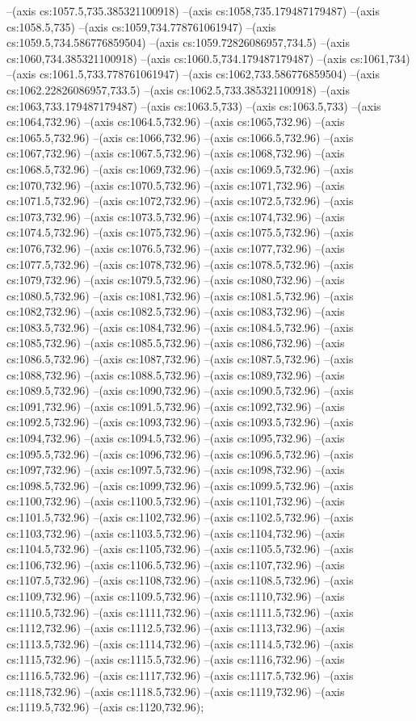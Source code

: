 --(axis cs:1057.5,735.385321100918)
--(axis cs:1058,735.179487179487)
--(axis cs:1058.5,735)
--(axis cs:1059,734.778761061947)
--(axis cs:1059.5,734.586776859504)
--(axis cs:1059.72826086957,734.5)
--(axis cs:1060,734.385321100918)
--(axis cs:1060.5,734.179487179487)
--(axis cs:1061,734)
--(axis cs:1061.5,733.778761061947)
--(axis cs:1062,733.586776859504)
--(axis cs:1062.22826086957,733.5)
--(axis cs:1062.5,733.385321100918)
--(axis cs:1063,733.179487179487)
--(axis cs:1063.5,733)
--(axis cs:1063.5,733)
--(axis cs:1064,732.96)
--(axis cs:1064.5,732.96)
--(axis cs:1065,732.96)
--(axis cs:1065.5,732.96)
--(axis cs:1066,732.96)
--(axis cs:1066.5,732.96)
--(axis cs:1067,732.96)
--(axis cs:1067.5,732.96)
--(axis cs:1068,732.96)
--(axis cs:1068.5,732.96)
--(axis cs:1069,732.96)
--(axis cs:1069.5,732.96)
--(axis cs:1070,732.96)
--(axis cs:1070.5,732.96)
--(axis cs:1071,732.96)
--(axis cs:1071.5,732.96)
--(axis cs:1072,732.96)
--(axis cs:1072.5,732.96)
--(axis cs:1073,732.96)
--(axis cs:1073.5,732.96)
--(axis cs:1074,732.96)
--(axis cs:1074.5,732.96)
--(axis cs:1075,732.96)
--(axis cs:1075.5,732.96)
--(axis cs:1076,732.96)
--(axis cs:1076.5,732.96)
--(axis cs:1077,732.96)
--(axis cs:1077.5,732.96)
--(axis cs:1078,732.96)
--(axis cs:1078.5,732.96)
--(axis cs:1079,732.96)
--(axis cs:1079.5,732.96)
--(axis cs:1080,732.96)
--(axis cs:1080.5,732.96)
--(axis cs:1081,732.96)
--(axis cs:1081.5,732.96)
--(axis cs:1082,732.96)
--(axis cs:1082.5,732.96)
--(axis cs:1083,732.96)
--(axis cs:1083.5,732.96)
--(axis cs:1084,732.96)
--(axis cs:1084.5,732.96)
--(axis cs:1085,732.96)
--(axis cs:1085.5,732.96)
--(axis cs:1086,732.96)
--(axis cs:1086.5,732.96)
--(axis cs:1087,732.96)
--(axis cs:1087.5,732.96)
--(axis cs:1088,732.96)
--(axis cs:1088.5,732.96)
--(axis cs:1089,732.96)
--(axis cs:1089.5,732.96)
--(axis cs:1090,732.96)
--(axis cs:1090.5,732.96)
--(axis cs:1091,732.96)
--(axis cs:1091.5,732.96)
--(axis cs:1092,732.96)
--(axis cs:1092.5,732.96)
--(axis cs:1093,732.96)
--(axis cs:1093.5,732.96)
--(axis cs:1094,732.96)
--(axis cs:1094.5,732.96)
--(axis cs:1095,732.96)
--(axis cs:1095.5,732.96)
--(axis cs:1096,732.96)
--(axis cs:1096.5,732.96)
--(axis cs:1097,732.96)
--(axis cs:1097.5,732.96)
--(axis cs:1098,732.96)
--(axis cs:1098.5,732.96)
--(axis cs:1099,732.96)
--(axis cs:1099.5,732.96)
--(axis cs:1100,732.96)
--(axis cs:1100.5,732.96)
--(axis cs:1101,732.96)
--(axis cs:1101.5,732.96)
--(axis cs:1102,732.96)
--(axis cs:1102.5,732.96)
--(axis cs:1103,732.96)
--(axis cs:1103.5,732.96)
--(axis cs:1104,732.96)
--(axis cs:1104.5,732.96)
--(axis cs:1105,732.96)
--(axis cs:1105.5,732.96)
--(axis cs:1106,732.96)
--(axis cs:1106.5,732.96)
--(axis cs:1107,732.96)
--(axis cs:1107.5,732.96)
--(axis cs:1108,732.96)
--(axis cs:1108.5,732.96)
--(axis cs:1109,732.96)
--(axis cs:1109.5,732.96)
--(axis cs:1110,732.96)
--(axis cs:1110.5,732.96)
--(axis cs:1111,732.96)
--(axis cs:1111.5,732.96)
--(axis cs:1112,732.96)
--(axis cs:1112.5,732.96)
--(axis cs:1113,732.96)
--(axis cs:1113.5,732.96)
--(axis cs:1114,732.96)
--(axis cs:1114.5,732.96)
--(axis cs:1115,732.96)
--(axis cs:1115.5,732.96)
--(axis cs:1116,732.96)
--(axis cs:1116.5,732.96)
--(axis cs:1117,732.96)
--(axis cs:1117.5,732.96)
--(axis cs:1118,732.96)
--(axis cs:1118.5,732.96)
--(axis cs:1119,732.96)
--(axis cs:1119.5,732.96)
--(axis cs:1120,732.96);


